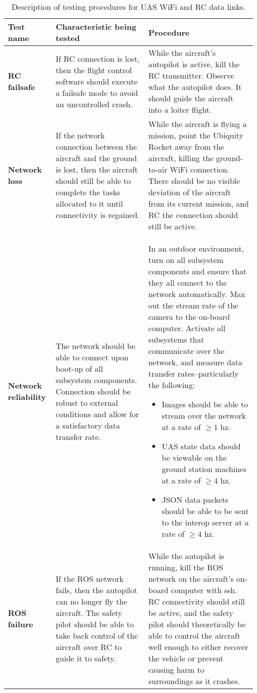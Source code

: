 \documentclass[]{auvsi_doc}
\begin{document}
\begin{center}
	\begin{longtable}[H]{|P{3cm}|P{5.75cm}|P{5.75cm}|}
		\caption{Description of testing procedures for UAS WiFi and RC data links.}
		\label{tab:sstests}\\
		\hline
		{\color[HTML]{000000} \textbf{Test name}} & {\color[HTML]{000000}\textbf{Characteristic being tested}}	& {\color[HTML]{000000}\textbf{Procedure}} \\
		\hline
		\textbf{RC failsafe}	& If RC connection is lost, then the flight control software should execute a failsafe mode to avoid an uncontrolled crash. &	While the aircraft's autopilot is active, kill the RC transmitter. Observe what the autopilot does. It should guide the aircraft into a loiter flight. \\
		\hline
		\textbf{Network loss}	& If the network connection between the aircraft and the ground is lost, then the aircraft should still be able to complete the tasks allocated to it until connectivity is regained. &	While the aircraft is flying a mission, point the Ubiquity Rocket away from the aircraft, killing the ground-to-air WiFi connection. There should be no visible deviation of the aircraft from its current mission, and RC the connection should still be active. \\
		\hline
		\textbf{Network reliability}	& The network should be able to connect upon boot-up of all subsystem components. Connection should be robust to external conditions and allow for a satisfactory data transfer rate. &	In an outdoor environment, turn on all subsystem components and ensure that they all connect to the network automatically. Max out the stream rate of the camera to the on-board computer. Activate all subsystems that communicate over the network, and measure data transfer rates--particularly the following: \begin{itemize}
			\item Images should be able to stream over the network at a rate of $\geq 1$ hz.
			\item UAS state data should be viewable on the ground station machines at a rate of  $\geq 4$ hz.
			\item JSON data packets should be able to be sent to the interop server at a rate of $\geq 4$ hz.
		\end{itemize} \\
		\hline
		\textbf{ROS failure}	& If the ROS network fails, then the autopilot can no longer fly the aircraft. The safety pilot should be able to take back control of the aircraft over RC to guide it to safety. &	While the autopilot is running, kill the ROS network on the aircraft's on-board computer with ssh. RC connectivity should still be active, and the safety pilot should theoretically be able to control the aircraft well enough to either recover the vehicle or prevent causing harm to surroundings as it crashes. \\
		\hline
	\end{longtable}
\end{center}
\end{document}
